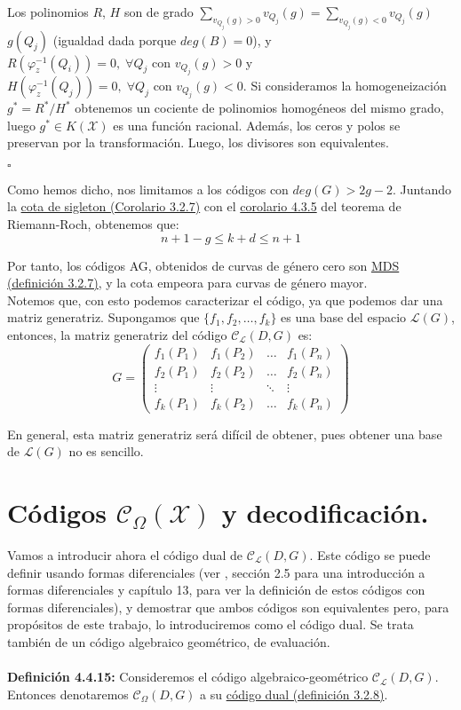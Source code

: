\documentclass[11pt,spanish]{book}
\newcommand{\qed}{\begin{flushright} $\square$ \end{flushright}}
\begin{document}
Los polinomios $R$, $H$ son de grado $\sum_{v_{Q_j}(g)>0}v_{Q_j}(g)=\sum_{v_{Q_j}(g)<0}v_{Q_j}(g)$ $g(Q_j)$ (igualdad dada porque $deg(B)=0$), y $R(\varphi_{z}^{-1}(Q_{i}))=0,\;\forall Q_{j}\text{ con }v_{Q_j}(g)>0$ y $H(\varphi_{z}^{-1}(Q_{j}))=0,\;\forall Q_{j}\text{ con }v_{Q_j}(g)<0$. Si consideramos la homogeneización $g^{*}=R^{*}/H^{*}$ obtenemos un cociente de polinomios homogéneos del mismo grado, luego $g^{*}\in K(\mathbf{\mathcal{X}})$ es una función racional. Además, los ceros y polos se preservan por la transformación. Luego, los divisores son equivalentes. 
\qed

Como hemos dicho, nos limitamos a los códigos con $deg(G)>2g-2$. Juntando la \hyperlink{sigleton}{cota de sigleton (Corolario 3.2.7)} con el \hyperlink{fuertementeAG}{corolario 4.3.5} del teorema de Riemann-Roch, obtenemos que:
$$n+1-g\leq k+d\leq n+1$$

Por tanto, los códigos AG, obtenidos de curvas de género cero son \hyperlink{MDS}{MDS (definición 3.2.7)}, y la cota empeora para curvas de género mayor.\\

Notemos que, con esto podemos caracterizar el código, ya que podemos dar una matriz generatriz. Supongamos que $\{f_1,f_2,\ldots,f_k\}$ es una base del espacio $\mathcal{L}(G)$, entonces, la matriz generatriz del código $\mathcal{C}_{\mathcal{L}}(D,G)$ es:
$$G=
\begin{pmatrix}
f_1(P_1) & f_1(P_2) & \ldots & f_1(P_n)\\
f_2(P_1) & f_2(P_2) & \ldots & f_2(P_n)\\
\vdots & \vdots & \ddots & \vdots\\
f_k(P_1) & f_k(P_2) & \ldots & f_k(P_n)
\end{pmatrix}
$$

En general, esta matriz generatriz será difícil de obtener, pues obtener una base de $\mathcal{L}(G)$ no es sencillo. 
\section{Códigos $\mathcal{C}_{\Omega}(\mathbf{\mathcal{X}})$ y decodificación.}
Vamos a introducir ahora el código dual de $\mathcal{C}_{\mathcal{L}}(D,G)$. Este código se puede definir usando formas diferenciales (ver \cite{Tom-Høholdt}, sección 2.5 para una introducción a formas diferenciales y \cite{Munuera} capítulo 13, para ver la definición de estos códigos con formas diferenciales), y demostrar que ambos códigos son equivalentes pero, para propósitos de este trabajo, lo introduciremos como el código dual. Se trata también de un código algebraico geométrico, de evaluación.\\
\\\hypertarget{def4.4.15}{\textbf{Definición 4.4.15: }} Consideremos el código algebraico-geométrico $\mathcal{C}_{\mathcal{L}}(D,G)$. Entonces denotaremos $\mathcal{C}_{\Omega}(D,G)$ a su \hyperlink{codigodual}{código dual (definición 3.2.8)}.\\
\end{document}
